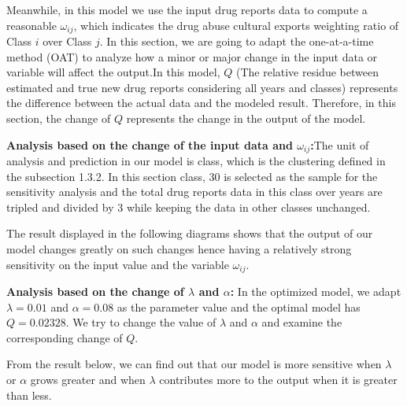 \documentclass{mcmthesis}
\begin{document}
Meanwhile, in this model we use the input drug reports data to compute a reasonable $\omega_{ij}$, which indicates the drug abuse cultural exports weighting ratio of Class $i$ over Class $j$. In this section, we are going to adapt the one-at-a-time method (OAT) to analyze how a minor or major change in the input data or variable will affect the output.In this model, $Q$ (The relative residue between estimated and true new drug reports considering all years and classes) represents the difference between the actual data and the modeled result. Therefore, in this section, the change of $Q$ represents the change in the output of the model.
 
\noindent \textbf{Analysis based on the change of the input data and $\omega_{ij}$:}The unit of analysis and prediction in our model is class, which is the clustering defined in the subsection 1.3.2. In this section class, 30 is selected as the sample for the sensitivity analysis and the total drug reports data in this class over years are tripled and divided by 3 while keeping the data in other classes unchanged. 

The result displayed in the following diagrams shows that the output of our model changes greatly on such changes hence having a relatively strong sensitivity on the input value and the variable $\omega_{ij}$.

\noindent \textbf{Analysis based on the change of $\lambda$ and $\alpha$:}
In the optimized model, we adapt $\lambda = 0.01$ and $\alpha = 0.08$ as the parameter value and the optimal model has $Q = 0.02328$. We try to change the value of $\lambda$ and $\alpha$ and examine the corresponding change of $Q$. 

From the result below, we can find out that our model is more sensitive when $\lambda$ or $\alpha$ grows greater and when $\lambda$ contributes more to the output when it is greater than less.
\end{document}
